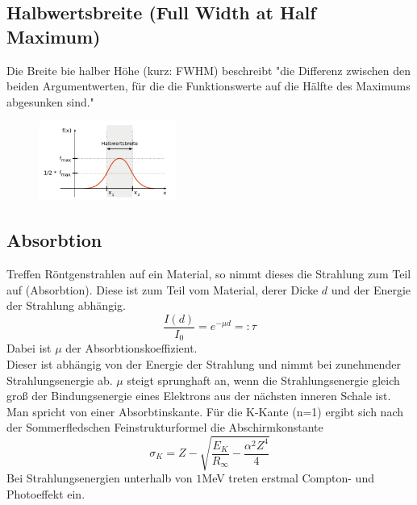 \subsection{Halbwertsbreite (Full Width at Half Maximum)}
Die Breite bie halber Höhe (kurz: FWHM) beschreibt "die Differenz zwischen 
den beiden Argumentwerten, für die die Funktionswerte auf die 
Hälfte des Maximums abgesunken sind."\cite{wiki2}
\begin{figure}
    \centering
    \includegraphics[width=0.4\textwidth]{plots/Halbwertsbreite.png}
    \caption{}
\end{figure}
\subsection{Absorbtion}
Treffen Röntgenstrahlen auf ein Material, so nimmt dieses die Strahlung zum Teil
auf (Absorbtion). Diese ist zum Teil vom Material, derer Dicke $d$ und der Energie 
der Strahlung abhängig.
\begin{equation}
    \frac{I(d)}{I_0}=e^{-\mu d}=:\tau
\end{equation}
Dabei ist $\mu$ der Absorbtionskoeffizient.\\
Dieser ist abhängig von der Energie der Strahlung und nimmt bei zunehmender
Strahlungsenergie ab. $\mu$ steigt sprunghaft an, wenn die Strahlungsenergie
gleich groß der Bindungsenergie eines Elektrons aus der nächsten inneren Schale ist.
Man spricht von einer Absorbtinskante.
Für die K-Kante (n=1) ergibt sich nach der Sommerfledschen Feinstrukturformel
die Abschirmkonstante
\begin{equation}
    \sigma_K=Z-\sqrt{\frac{E_K}{R_{\infty}}-\frac{\alpha^2Z^4}{4}}
\end{equation}
Bei Strahlungsenergien unterhalb von $1$MeV treten erstmal Compton- und Photoeffekt ein.



